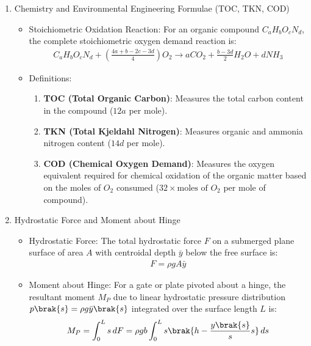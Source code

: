 \begin{enumerate}[label=\thesubsection.\arabic*, ref=\thesubsection.\theenumi,itemsep=0pt]
\item Chemistry and Environmental Engineering Formulae (TOC, TKN, COD)
\begin{itemize}
\item Stoichiometric Oxidation Reaction: For an organic compound $C_aH_bO_cN_d$, the complete stoichiometric oxygen demand reaction is:
\begin{align}
C_aH_bO_cN_d + \left(\frac{4a + b - 2c - 3d}{4}\right) O_2 \longrightarrow aCO_2 + \frac{b - 3d}{2}H_2O + dNH_3 \label{eq:stoich_oxidation}
\end{align}
\item Definitions:
\begin{enumerate}
	\item {\bfseries TOC (Total Organic Carbon)}: Measures the total carbon content in the compound ($12a$ per mole).
	\item {\bfseries TKN (Total Kjeldahl Nitrogen)}: Measures organic and ammonia nitrogen content ($14d$ per mole).
	\item {\bfseries COD (Chemical Oxygen Demand)}: Measures the oxygen equivalent required for chemical oxidation of the organic matter based on the moles of $O_2$ consumed ($32 \times \text{moles of } O_2$ per mole of compound).
\end{enumerate}
\end{itemize}

\item Hydrostatic Force and Moment about Hinge
\begin{itemize}
\item Hydrostatic Force: The total hydrostatic force $F$ on a submerged plane surface of area $A$ with centroidal depth $\bar{y}$ below the free surface is:
\begin{align}
F = \rho g A \bar{y} \label{eq:hydrostatic_force}
\end{align}
\item Moment about Hinge: For a gate or plate pivoted about a hinge, the resultant moment $M_P$ due to linear hydrostatic pressure distribution $p\brak{s} = \rho g \bar{y}\brak{s}$ integrated over the surface length $L$ is:
\begin{align}
M_P = \int_{0}^{L} s \, dF = \rho g b \int_{0}^{L} s \brak{h - \frac{y\brak{s}}{s}s} \, ds \label{eq:moment_about_hinge}
\end{align}
\end{itemize}


\end{enumerate}
